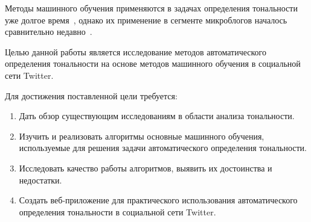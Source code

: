 Методы машинного обучения применяются в задачах определения тональности 
уже долгое время~\cite{panglee}, однако их применение в сегменте микроблогов 
началось сравнительно недавно~\cite{distsuperv}.

\vspace{0.5cm}

Целью данной работы является исследование методов автоматического 
определения тональности на основе методов машинного обучения в социальной 
сети Twitter. 

Для достижения поставленной цели требуется:

\begin{enumerate}

\item Дать обзор существующим исследованиям в области анализа тональности.

\item Изучить и реализовать алгоритмы основные машинного обучения, используемые для решения задачи автоматического определения тональности.

\item Исследовать качество работы алгоритмов, выявить их достоинства и недостатки.

\item Создать веб-приложение для практического использования автоматического определения тональности в социальной сети Twitter. 

\end{enumerate}